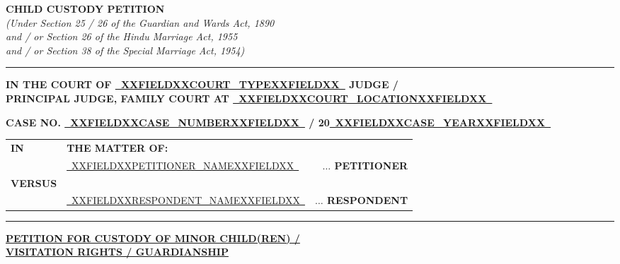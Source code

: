 \documentclass[12pt,a4paper]{article}
\newcommand{\fillline}[1]{\underline{~#1~}}
\begin{document}
\begin{center}
    {\LARGE\textbf{CHILD CUSTODY PETITION}}\\[0.5em]
    {\normalsize\textit{(Under Section 25 / 26 of the Guardian and Wards Act, 1890}}\\
    {\normalsize\textit{and / or Section 26 of the Hindu Marriage Act, 1955}}\\
    {\normalsize\textit{and / or Section 38 of the Special Marriage Act, 1954)}}\\[0.5em]
    \rule{\linewidth}{0.8pt}
\end{center}

\vspace{0.5em}

\begin{center}
    \textbf{IN THE COURT OF \fillline{XXFIELDXXCOURT_TYPEXXFIELDXX} JUDGE /}\\
    \textbf{PRINCIPAL JUDGE, FAMILY COURT AT \fillline{XXFIELDXXCOURT_LOCATIONXXFIELDXX}}
\end{center}

\vspace{0.5em}

\begin{center}
    \textbf{CASE NO. \fillline{XXFIELDXXCASE_NUMBERXXFIELDXX} / 20\fillline{XXFIELDXXCASE_YEARXXFIELDXX}}
\end{center}

\vspace{1em}

\noindent
\begin{tabularx}{\textwidth}{@{}l X r@{}}
    \textbf{IN} & \textbf{THE MATTER OF:} & \\[0.5em]
    & \fillline{XXFIELDXXPETITIONER_NAMEXXFIELDXX} & \textbf{$\ldots$ PETITIONER}\\[0.5em]
    \textbf{VERSUS} & & \\[0.5em]
    & \fillline{XXFIELDXXRESPONDENT_NAMEXXFIELDXX} & \textbf{$\ldots$ RESPONDENT}
\end{tabularx}

\vspace{1em}
\rule{\linewidth}{0.4pt}

\begin{center}
    \uline{\textbf{PETITION FOR CUSTODY OF MINOR CHILD(REN) /}}\\
    \uline{\textbf{VISITATION RIGHTS / GUARDIANSHIP}}
\end{center}

\vspace{1em}
\end{document}

